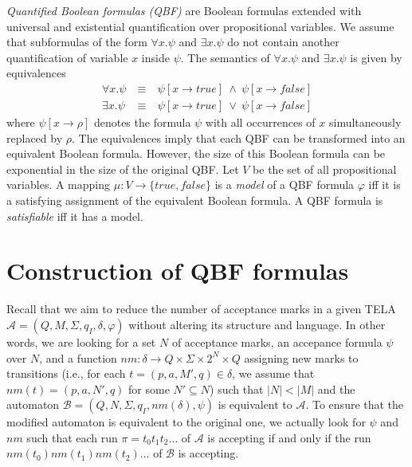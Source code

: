 \documentclass[a4paper,UKenglish,cleveref, autoref, thm-restate]{lipics-v2021}
\newcommand{\oM}{N}
\newcommand{\rem}{\mathit{nm}}
\def\false{\mathit{false}}
\def\true{\mathit{true}}
\newcommand{\mA}{\mathcal{A}}
\newcommand{\mB}{\mathcal{B}}
\begin{document}
\emph{Quantified Boolean formulas (QBF)} are Boolean formulas
extended with universal and existential quantification over
propositional variables. We assume that subformulas of the form
$\forall x.\psi$ and $\exists x.\psi$ do not contain another
quantification of variable $x$ inside $\psi$. The semantics of
$\forall x.\psi$ and $\exists x.\psi$ is given by equivalences
\[
  \begin{array}{rcl}
    \forall x.\psi &~\equiv~& \psi[x\rightarrow\true]~\wedge~\psi[x\rightarrow\false]\\
    \exists x.\psi &~\equiv~& \psi[x\rightarrow\true]~\vee~   \psi[x\rightarrow\false]
  \end{array}
\]
where $\psi[x\rightarrow \rho]$ denotes the formula $\psi$ with all
occurrences of $x$ simultaneously replaced by $\rho$. The equivalences
imply that each QBF can be transformed into an equivalent Boolean
formula. However, the size of this Boolean formula can be exponential
in the size of the original QBF. Let $V$ be the set of all
propositional variables. A mapping $\mu:V\rightarrow\{\true,\false\}$
is a \emph{model} of a QBF formula $\varphi$ iff it is a satisfying
assignment of the equivalent Boolean formula. A QBF formula is
\emph{satisfiable} iff it has a model.



\section{Construction of QBF formulas}\label{sec:qbf}

Recall that we aim to reduce the number of acceptance marks in a given
TELA $\mA =(Q,M,\Sigma,q_I,\delta,\varphi)$ without altering its
structure and language. In other words, we are looking for a set $\oM$
of acceptance marks, an accepance formula $\psi$ over $\oM$, and a
function
$\rem:\delta\rightarrow Q \times \Sigma \times 2^{\oM}\times Q$
assigning new marks to transitions (i.e., for each
$t=(p,a,M',q)\in\delta$, we assume that $\rem(t)=(p,a,\oM',q)$ for
some $\oM'\subseteq\oM$) such that $|\oM|<|M|$ and the automaton
$\mB=(Q,\oM,\Sigma,q_I,\rem(\delta),\psi)$ is equivalent to $\mA$. To
ensure that the modified automaton is equivalent to the original one,
we actually look for $\psi$ and $\rem$ such that each run
$\pi=t_0t_1t_2\ldots$ of $\mA$ is accepting if and only if the run
$\rem(t_0)\rem(t_1)\rem(t_2)\ldots$ of $\mB$ is accepting.
\end{document}
